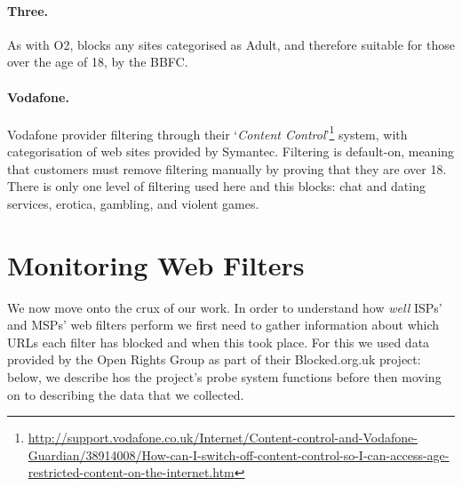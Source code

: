 \documentclass{bmcart}
\begin{document}
\paragraph{Three.}
As with O2, blocks any sites categorised as Adult, and therefore suitable for those over the age of 18, by the BBFC.

\paragraph{Vodafone.}
Vodafone provider filtering through their `\textit{Content Control}'\footnote{\url{http://support.vodafone.co.uk/Internet/Content-control-and-Vodafone-Guardian/38914008/How-can-I-switch-off-content-control-so-I-can-access-age-restricted-content-on-the-internet.htm}} system, with categorisation of web sites provided by Symantec.
Filtering is default-on, meaning that customers must remove filtering manually by proving that they are over 18.
There is only one level of filtering used here and this blocks: chat and dating services, erotica, gambling, and violent games.


\section*{Monitoring Web Filters}
We now move onto the crux of our work.
In order to understand how \textit{well} ISPs' and MSPs' web filters perform we first need to gather information about which URLs each filter has blocked and when this took place.
For this we used data provided by the Open Rights Group as part of their Blocked.org.uk project: below, we describe hos the project's probe system functions before then moving on to describing the data that we collected.

\end{document}
